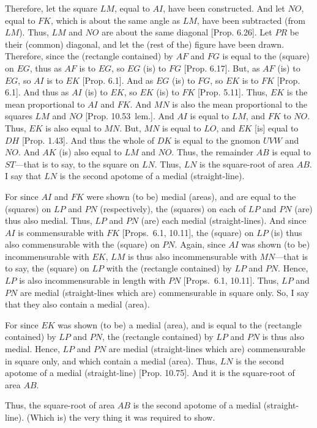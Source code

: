 \begin{Parallel}{}{}
{Therefore, let the square $LM$, equal to $AI$, have been constructed. And
let $NO$, equal to $FK$, which is about the same angle as $LM$, have
been subtracted (from $LM$). Thus, $LM$ and $NO$ are about the same
diagonal [Prop. 6.26]. Let $PR$ be their (common) diagonal,
and let the (rest of the) figure have been drawn. Therefore, since
the (rectangle contained) by $AF$ and $FG$ is equal to the (square) on
$EG$, thus as $AF$ is to $EG$, so $EG$ (is) to $FG$
[Prop. 6.17]. But, as $AF$ (is) to $EG$, so
$AI$ is to $EK$ [Prop. 6.1]. And as $EG$ (is)
to $FG$, so $EK$ is to $FK$ [Prop. 6.1]. And thus
as $AI$ (is) to $EK$, so $EK$ (is) to $FK$ [Prop. 5.11]. Thus, $EK$
is the mean proportional to $AI$ and $FK$. And $MN$ is also the
mean proportional to the squares $LM$ and $NO$ [Prop. 10.53~lem.]. And $AI$
is equal to $LM$, and $FK$ to $NO$. Thus, $EK$ is also equal to $MN$.
But, $MN$ is equal to $LO$, and $EK$ [is] equal to $DH$ [Prop. 1.43]. And thus the whole
of $DK$ is equal to the gnomon $UVW$ and $NO$. And $AK$ (is) also
equal to $LM$ and $NO$. Thus, the remainder $AB$ is equal to $ST$---that 
is to say, to the square on $LN$. Thus, $LN$ is the square-root of area $AB$.
I say that $LN$ is the second apotome of a medial (straight-line).

For since $AI$ and $FK$ were shown (to be)
medial (areas), and are equal to the (squares) on $LP$ and $PN$ (respectively), the (squares) on each of $LP$ and $PN$ (are) thus also
medial. Thus, $LP$ and $PN$ (are) each medial (straight-lines).
And since $AI$ is commensurable with $FK$ [Props.~6.1, 10.11], the (square) on $LP$
(is) thus also commensurable with the (square) on $PN$.  Again, since
$AI$ was shown (to be) incommensurable with $EK$, $LM$ is thus
also incommensurable with $MN$---that is to say, the (square) on 
$LP$ with the (rectangle contained) by $LP$ and $PN$.
Hence, $LP$ is also incommensurable in length with $PN$ [Props.~6.1, 10.11]. Thus, $LP$ and $PN$
are medial (straight-lines which are) commensurable in square only.
So, I say that they also contain a medial (area).

For since $EK$ was shown (to be) a medial (area), and is equal to the
(rectangle contained) by $LP$ and $PN$, the (rectangle contained) by
$LP$ and $PN$ is thus also medial. Hence, $LP$ and $PN$
are medial (straight-lines which are) commensurable in square only, and
which contain a medial (area). Thus, $LN$ is the
second apotome of a medial (straight-line) [Prop. 10.75]. And it is the square-root of area
$AB$.

Thus, the square-root of area $AB$ is the second apotome of a medial (straight-line). (Which is) the very thing it was required to show.}
\end{Parallel}

